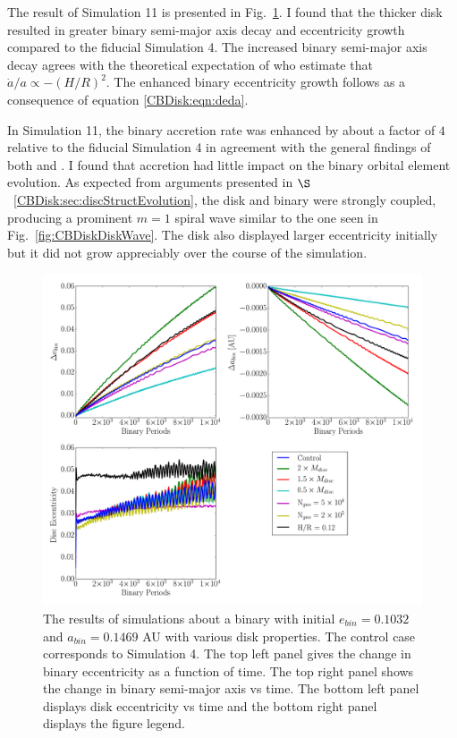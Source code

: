 The result of Simulation 11 is presented in Fig.~\ref{fig:CBDiskVarying}.  I found that the thicker disk resulted in greater binary semi-major axis decay and 
eccentricity growth compared to the fiducial Simulation 4.  The increased binary semi-major axis decay agrees with the theoretical expectation of 
\citet{Artymowicz1996b,Artymowicz2000} who estimate that $\dot{a}/a \propto -(H/R)^2$.  The enhanced binary eccentricity growth follows as a consequence of equation 
\ref{CBDisk:eqn:deda}.

In Simulation 11, the binary accretion rate was enhanced by about a factor of $4$ relative to the fiducial Simulation 4 in agreement with the general 
findings of both \citet{Young2015} and \citet{Ragusa2016}.  I found that accretion had little impact on the binary orbital element evolution.  As expected from arguments presented in $\S$~\ref{CBDisk:sec:discStructEvolution}, the disk and binary were strongly coupled, producing a prominent $m = 1$ spiral wave similar to the one seen in Fig.~\ref{fig:CBDiskDiskWave}.  The disk also displayed larger eccentricity initially but it did not grow appreciably over the course of the 
simulation.  
	
\begin{figure}
	\includegraphics[width=\textwidth]{f9}
    \caption{The results of simulations about a binary with initial $e_{bin} = 0.1032$ and $a_{bin} = 0.1469$ AU with various disk properties.  The control case corresponds to Simulation 4.  The top left panel gives the change in binary eccentricity as a function of time.  The top right panel shows the change in binary semi-major axis vs time.  The bottom left panel displays disk eccentricity vs time and the bottom right panel displays the figure legend.}
    \label{fig:CBDiskVarying}
\end{figure}
	
